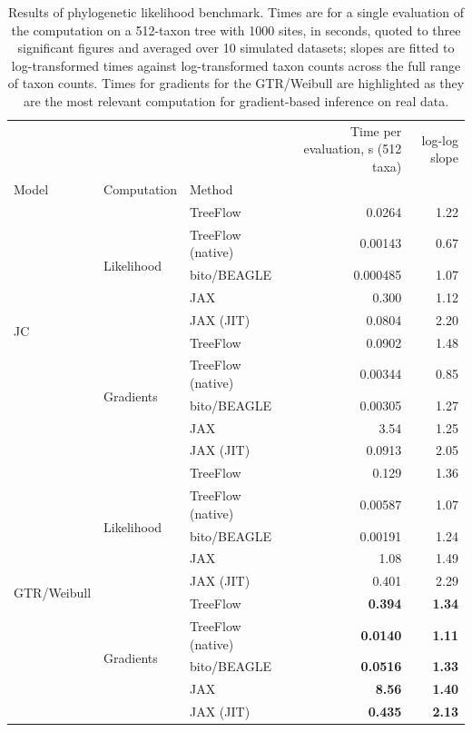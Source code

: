\documentclass[oupdraft]{sysbio_sse}
\begin{document}
\begin{table}
    \centering
    \begin{tabular}{lllrr}
\toprule
 &  &  & Time per evaluation, s (512 taxa) & log-log slope \\
Model & Computation & Method &  &  \\
\midrule
\multirow[t]{10}{*}{JC} & \multirow[t]{5}{*}{Likelihood} & TreeFlow & 0.0264 & 1.22 \\
 &  & TreeFlow (native) & 0.00143 & 0.67 \\
 &  & bito/BEAGLE & 0.000485 & 1.07 \\
 &  & JAX & 0.300 & 1.12 \\
 &  & JAX (JIT) & 0.0804 & 2.20 \\
 & \multirow[t]{5}{*}{Gradients} & TreeFlow & 0.0902 & 1.48 \\
 &  & TreeFlow (native) & 0.00344 & 0.85 \\
 &  & bito/BEAGLE & 0.00305 & 1.27 \\
 &  & JAX & 3.54 & 1.25 \\
 &  & JAX (JIT) & 0.0913 & 2.05 \\
\multirow[t]{10}{*}{GTR/Weibull} & \multirow[t]{5}{*}{Likelihood} & TreeFlow & 0.129 & 1.36 \\
 &  & TreeFlow (native) & 0.00587 & 1.07 \\
 &  & bito/BEAGLE & 0.00191 & 1.24 \\
 &  & JAX & 1.08 & 1.49 \\
 &  & JAX (JIT) & 0.401 & 2.29 \\
 & \multirow[t]{5}{*}{Gradients} & TreeFlow & \bfseries 0.394 & \bfseries 1.34 \\
 &  & TreeFlow (native) & \bfseries 0.0140 & \bfseries 1.11 \\
 &  & bito/BEAGLE & \bfseries 0.0516 & \bfseries 1.33 \\
 &  & JAX & \bfseries 8.56 & \bfseries 1.40 \\
 &  & JAX (JIT) & \bfseries 0.435 & \bfseries 2.13 \\
\bottomrule
\end{tabular}

    \caption{Results of phylogenetic likelihood benchmark. Times are for a single evaluation of the computation on a 512-taxon tree with 1000 sites, in seconds, quoted to three significant figures and averaged over 10 simulated datasets; slopes are fitted to log-transformed times against log-transformed taxon counts across the full range of taxon counts. Times for gradients for the GTR/Weibull are highlighted as they are the most relevant computation for gradient-based inference on real data.}
    \label{tab:benchmarkfit}
\end{table}
\end{document}
